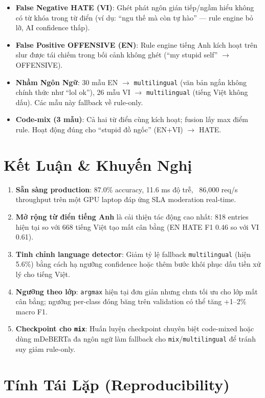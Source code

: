 \documentclass[11pt,a4paper]{article}
\begin{document}
\begin{itemize}
    \item \textbf{False Negative HATE (VI)}: Ghét phát ngôn gián tiếp/ngầm hiểu không có từ khóa trong từ điển (ví dụ: ``ngu thế mà còn tự hào'' --- rule engine bỏ lỡ, AI confidence thấp).
    \item \textbf{False Positive OFFENSIVE (EN)}: Rule engine tiếng Anh kích hoạt trên slur được tái chiếm trong bối cảnh không ghét (``my stupid self'' $\rightarrow$ OFFENSIVE).
    \item \textbf{Nhầm Ngôn Ngữ}: 30 mẫu EN $\rightarrow$ \texttt{multilingual} (văn bản ngắn không chính thức như ``lol ok''), 26 mẫu VI $\rightarrow$ \texttt{multilingual} (tiếng Việt không dấu). Các mẫu này fallback về rule-only.
    \item \textbf{Code-mix (3 mẫu)}: Cả hai từ điển cùng kích hoạt; fusion lấy max điểm rule. Hoạt động đúng cho ``stupid đồ ngốc'' (EN+VI) $\rightarrow$ HATE.
\end{itemize}

\section{Kết Luận \& Khuyến Nghị}

\begin{enumerate}
    \item \textbf{Sẵn sàng production}: 87.0\% accuracy, 11.6 ms độ trễ, ~86,000 req/s throughput trên một GPU laptop đáp ứng SLA moderation real-time.
    \item \textbf{Mở rộng từ điển tiếng Anh} là cải thiện tác động cao nhất: 818 entries hiện tại so với 668 tiếng Việt tạo mất cân bằng (EN HATE F1 0.46 so với VI 0.61).
    \item \textbf{Tinh chỉnh language detector}: Giảm tỷ lệ fallback \texttt{multilingual} (hiện 5.6\%) bằng cách hạ ngưỡng confidence hoặc thêm bước khôi phục dấu tiền xử lý cho tiếng Việt.
    \item \textbf{Ngưỡng theo lớp}: \texttt{argmax} hiện tại đơn giản nhưng chưa tối ưu cho lớp mất cân bằng; ngưỡng per-class đóng băng trên validation có thể tăng +1--2\% macro F1.
    \item \textbf{Checkpoint cho \texttt{mix}}: Huấn luyện checkpoint chuyên biệt code-mixed hoặc dùng mDeBERTa đa ngôn ngữ làm fallback cho \texttt{mix}/\texttt{multilingual} để tránh suy giảm rule-only.
\end{enumerate}

\section{Tính Tái Lặp (Reproducibility)}
\label{sec:repro}
\end{document}
